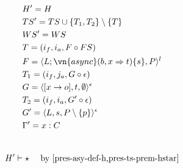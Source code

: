 \begin{alignat}{3}
    &H' = H \label{pres-asy-def-h}\\
    &TS' = TS \cup \{T_1, T_2\} \setminus \{T\} \label{pres-asy-def-ts'}\\
    &WS' = WS \label{pres-asy-def-ws'}\\
    &T = (i_f, i_a, F \circ FS) \label{pres-asy-def-t}\\
    &F = \langle L; \vn{async}(b, x \Rightarrow t) \{s\}, P \rangle^l \label{pres-asy-def-f}\\
    &T_1 = (i_f, j_a, G \circ \epsilon) \label{pres-asy-def-t1}\\
    &G = \langle [x \rightarrow o], t, \emptyset \rangle^\epsilon \label{pres-asy-def-g}\\
    &T_2 = (i_f, i_a, G' \circ \epsilon)  \label{pres-asy-def-t2}\\
    &G' = \langle L, s, P \setminus \{p\} \rangle^\epsilon \label{pres-asy-def-g'}\\
    &\Gamma' = x : C  \label{pres-asy-def-xxxxx}\\
    &  \label{pres-asy-def-xxxxx}\\
\end{alignat}

\begin{alignat}{3}
    & H' \vdash \star \label{pres-asy-zzzzz}
        && \text{ by \cref{pres-asy-def-h,pres-ts-prem-hstar}}\\
\end{alignat}

